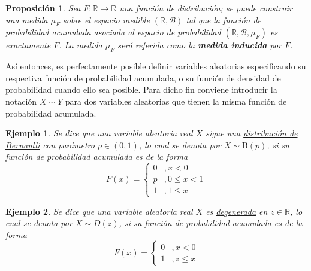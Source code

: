 \documentclass[12pt,letterpaper,draft]{book}
\newtheorem{proposicion}[teorema]{Proposición}
\newtheorem{ejemplo}{Ejemplo}[chapter]
\newcommand{\R}{\mathbb{R}}
\begin{document}
\begin{proposicion}
Sea $F:\R \rightarrow \R$ una función de distribución; se puede construir una medida $\mu_F$ sobre el espacio medible $(\R, \mathcal{B})$ tal que la función de probabilidad acumulada asociada al espacio de probabilidad $(\R, \mathcal{B}, \mu_F)$ es exactamente $F$.
%
La medida $\mu_F$ será referida como la \textbf{medida inducida} por $F$.
\end{proposicion}

Así entonces, es perfectamente posible definir variables aleatorias especificando su respectiva función de probabilidad acumulada, o su función de densidad de probabilidad cuando ello sea posible.
%
Para dicho fin conviene introducir la notación $X \sim Y$ para dos variables aleatorias que tienen la misma función de probabilidad acumulada.

\begin{ejemplo}
Se dice que una variable aleatoria real $X$ sigue una \ul{distribuci\'on de Bernaulli} con parámetro $p\in (0,1)$, lo cual se denota por $X\sim \text{B}(p)$, si su función de probabilidad acumulada es de la forma
\begin{equation}
F(x) = \begin{cases}
0 &, x < 0 \\
p &, 0 \leq x < 1 \\
1 &, 1 \leq x
\end{cases}
\end{equation}
\end{ejemplo}

\begin{ejemplo}
Se dice que una variable aleatoria real $X$ es \ul{degenerada} en $z\in \R$, lo cual se denota por $X\sim D(z)$, si su función de probabilidad acumulada es de la forma
\begin{equation}
F(x) = \begin{cases}
0 &, x < 0 \\
1 &, z \leq x
\end{cases}
\end{equation}
\end{ejemplo}
\end{document}

